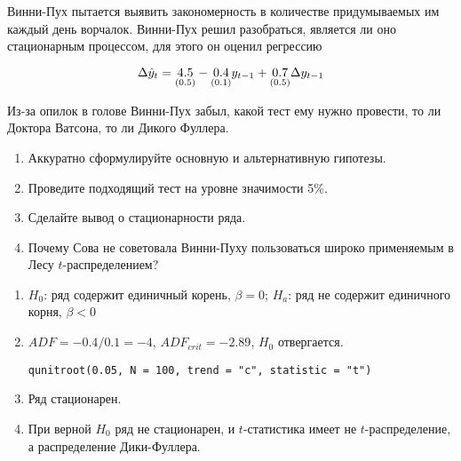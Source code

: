 \begin{problem}
Винни-Пух пытается выявить закономерность в количестве придумываемых им каждый день ворчалок.  Винни-Пух решил разобраться, является ли оно стационарным процессом, для этого он оценил регрессию

\[ \Delta \hat{y}_t = \underset{(0.5)}{4.5} - \underset{(0.1)}{0.4}y_{t-1} +\underset{(0.5)}{0.7} \Delta y_{t-1} \]

Из-за опилок в голове Винни-Пух забыл, какой тест ему нужно провести, то ли Доктора Ватсона, то ли Дикого Фуллера.

\begin{enumerate}
\item Аккуратно сформулируйте основную и альтернативную гипотезы.
\item Проведите подходящий тест на уровне значимости 5\%.
\item Сделайте вывод о стационарности ряда.
\item Почему Сова не советовала Винни-Пуху пользоваться широко применяемым в Лесу $t$-распределением?
\end{enumerate}


\begin{sol}

\begin{enumerate}
\item $H_0$: ряд содержит единичный корень, $\beta=0$; $H_a$: ряд не содержит единичного корня, $\beta<0$
\item $ADF=-0.4/0.1=-4$, $ADF_{crit}=-2.89$, $H_0$ отвергается.

\begin{verbatim}
qunitroot(0.05, N = 100, trend = "c", statistic = "t")
\end{verbatim}

\item Ряд стационарен.
\item При верной $H_0$ ряд не стационарен, и  $t$-статистика имеет не $t$-распределение, а распределение Дики-Фуллера.
\end{enumerate}
\end{sol}
\end{problem}




